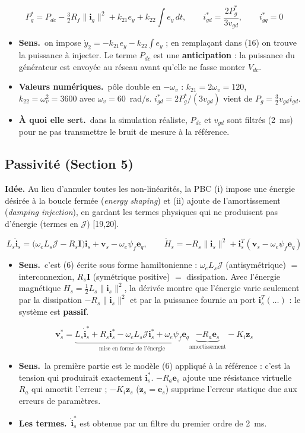 \documentclass[11pt,a4paper]{article}
\newcommand{\bv}[1]{\mathbf{#1}}
\newcommand{\Jm}{\boldsymbol{\mathcal{J}}}
\newenvironment{expl}{\begin{itemize}[leftmargin=1.2em,itemsep=2pt,topsep=2pt]}{\end{itemize}}
\newcommand{\sens}{\item \textbf{Sens.}~}
\newcommand{\termes}{\item \textbf{Les termes.}~}
\newcommand{\num}{\item \textbf{Valeurs numériques.}~}
\newcommand{\role}{\item \textbf{À quoi elle sert.}~}
\begin{document}
\begin{equation}\tag{17}
P_g^* = P_{dc} - \tfrac32R_f\|\bv{i}_g\|^2 + k_{21}e_y + k_{22}\!\int\! e_y\,dt,\qquad
i_{gd}^*=\frac{2P_g^*}{3v_{gd}},\qquad i_{gq}^*=0
\end{equation}
\begin{expl}
\sens on impose $\dot y_2=-k_{21}e_y-k_{22}\int e_y$ ; en remplaçant dans (16) on trouve la puissance à
injecter. Le terme $P_{dc}$ est une \textbf{anticipation} : la puissance du générateur est envoyée au réseau
avant qu'elle ne fasse monter $V_{dc}$.
\num pôle double en $-\omega_v$ : $k_{21}=2\omega_v=120$, $k_{22}=\omega_v^2=3600$ avec
$\omega_v=60$~rad/s. $i_{gd}^*=2P_g^*/(3v_{gd})$ vient de $P_g=\frac32v_{gd}i_{gd}$.
\role dans la simulation réaliste, $P_{dc}$ et $v_{gd}$ sont filtrés (2~ms) pour ne pas transmettre le bruit
de mesure à la référence.
\end{expl}

\subsection{Passivité (Section 5)}
\textbf{Idée.} Au lieu d'annuler toutes les non-linéarités, la PBC (i) impose une énergie désirée à la
boucle fermée (\emph{energy shaping}) et (ii) ajoute de l'amortissement (\emph{damping injection}), en
gardant les termes physiques qui ne produisent pas d'énergie (termes en $\Jm$) [19,20].

\begin{equation}\tag{18}
L_s\dot{\bv{i}}_s = \bigl(\omega_eL_s\Jm - R_s\bv{I}\bigr)\bv{i}_s + \bv{v}_s - \omega_e\psi_f\bv{e}_q ,
\qquad \dot H_s = -R_s\|\bv{i}_s\|^2 + \bv{i}_s^T(\bv{v}_s-\omega_e\psi_f\bv{e}_q)
\end{equation}
\begin{expl}
\sens c'est (6) écrite sous forme hamiltonienne : $\omega_eL_s\Jm$ (antisymétrique) $=$ interconnexion,
$R_s\bv I$ (symétrique positive) $=$ dissipation. Avec l'énergie magnétique $H_s=\frac12L_s\|\bv i_s\|^2$,
la dérivée montre que l'énergie varie seulement par la dissipation $-R_s\|\bv i_s\|^2$ et par la puissance
fournie au port $\bv i_s^T(\ldots)$ : le système est \textbf{passif}.
\end{expl}

\begin{equation}\tag{19}
\bv{v}_s^* = \underbrace{L_s\dot{\bv{i}}_s^* + R_s\bv{i}_s^* - \omega_eL_s\Jm\bv{i}_s^* + \omega_e\psi_f\bv{e}_q}_{\text{mise en forme de l'énergie}}
\underbrace{- R_a\bv{e}_s}_{\text{amortissement}} - K_i\bv{z}_s
\end{equation}
\begin{expl}
\sens la première partie est le modèle (6) appliqué à la référence : c'est la tension qui produirait
exactement $\bv i_s^*$. $-R_a\bv e_s$ ajoute une résistance virtuelle $R_a$ qui amortit l'erreur ;
$-K_i\bv z_s$ ($\dot{\bv z}_s=\bv e_s$) supprime l'erreur statique due aux erreurs de paramètres.
\termes $\dot{\bv i}_s^*$ est obtenue par un filtre du premier ordre de 2~ms.
\end{expl}
\end{document}

